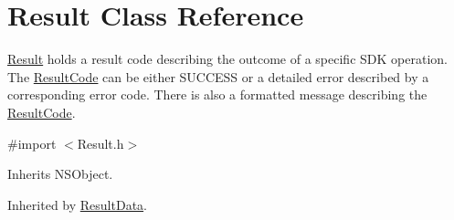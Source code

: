 \hypertarget{interface_result}{}\section{Result Class Reference}
\label{interface_result}


\hyperlink{interface_result}{Result} holds a result code describing the outcome of a specific S\+D\+K operation. The \hyperlink{interface_result_code}{Result\+Code} can be either S\+U\+C\+C\+E\+S\+S or a detailed error described by a corresponding error code. There is also a formatted message describing the \hyperlink{interface_result_code}{Result\+Code}.  




{\ttfamily \#import $<$Result.\+h$>$}



Inherits N\+S\+Object.



Inherited by \hyperlink{interface_result_data}{Result\+Data}.

